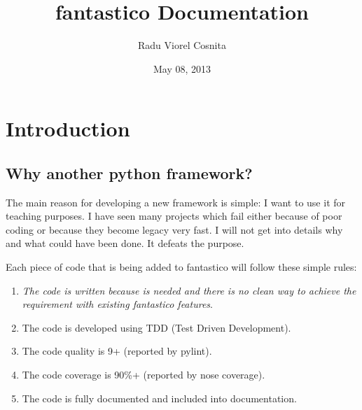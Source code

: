 \documentclass[letterpaper,10pt,english]{sphinxmanual}
\title{fantastico Documentation}
\date{May 08, 2013}
\author{Radu Viorel Cosnita}
\begin{document}
\maketitle
\tableofcontents
{}\label{index::doc}



\chapter{Introduction}
\label{intro:introduction}\label{intro::doc}\label{intro:fantastico-framework}

\section{Why another python framework?}
\label{intro:why-another-python-framework}
The main reason for developing a new framework is simple: I want to use it for teaching purposes. I have seen many projects which
fail either because of poor coding or because they become legacy very fast. I will not get into details why and what could have
been done. It defeats the purpose.

Each piece of code that is being added to fantastico will follow these simple rules:
\begin{enumerate}
\item {} 
\emph{The code is written because is needed and there is no clean way to achieve the requirement with existing fantastico features}.

\item {} 
The code is developed using TDD (Test Driven Development).

\item {} 
The code quality is 9+ (reported by pylint).

\item {} 
The code coverage is 90\%+ (reported by nose coverage).

\item {} 
The code is fully documented and included into documentation.

\end{enumerate}
\end{document}
